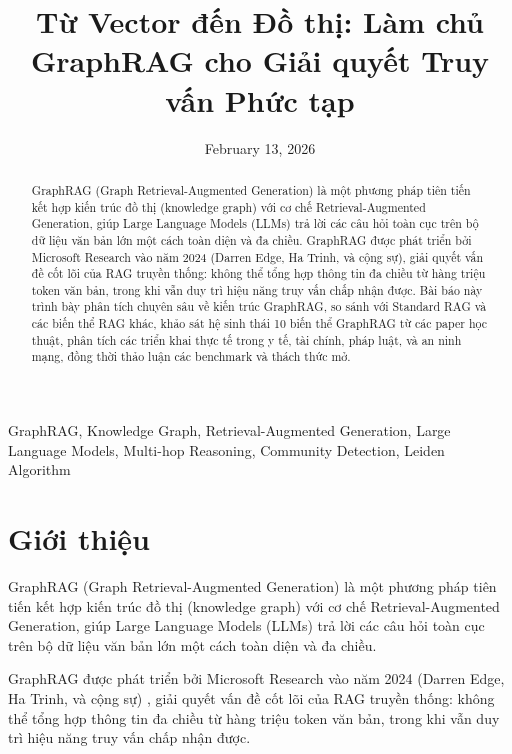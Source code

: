 \documentclass[conference]{IEEEtran}
\title{Từ Vector đến Đồ thị: Làm chủ GraphRAG cho Giải quyết Truy vấn Phức tạp}
\author{
    \IEEEauthorblockN{Sisyphus --- Dean of Computer Science (Simulation)}
    \IEEEauthorblockA{\textit{Academic Research Paper}}
}
\date{February 13, 2026}
\begin{document}
\maketitle

\begin{abstract}
GraphRAG (Graph Retrieval-Augmented Generation) là một phương pháp tiên tiến kết hợp kiến trúc đồ thị (knowledge graph) với cơ chế Retrieval-Augmented Generation, giúp Large Language Models (LLMs) trả lời các câu hỏi toàn cục trên bộ dữ liệu văn bản lớn một cách toàn diện và đa chiều. GraphRAG được phát triển bởi Microsoft Research vào năm 2024 (Darren Edge, Ha Trinh, và cộng sự), giải quyết vấn đề cốt lõi của RAG truyền thống: không thể tổng hợp thông tin đa chiều từ hàng triệu token văn bản, trong khi vẫn duy trì hiệu năng truy vấn chấp nhận được. Bài báo này trình bày phân tích chuyên sâu về kiến trúc GraphRAG, so sánh với Standard RAG và các biến thể RAG khác, khảo sát hệ sinh thái 10 biến thể GraphRAG từ các paper học thuật, phân tích các triển khai thực tế trong y tế, tài chính, pháp luật, và an ninh mạng, đồng thời thảo luận các benchmark và thách thức mở.
\end{abstract}

\begin{IEEEkeywords}
GraphRAG, Knowledge Graph, Retrieval-Augmented Generation, Large Language Models, Multi-hop Reasoning, Community Detection, Leiden Algorithm
\end{IEEEkeywords}

\section{Giới thiệu}

GraphRAG (Graph Retrieval-Augmented Generation) là một phương pháp tiên tiến kết hợp kiến trúc đồ thị (knowledge graph) với cơ chế Retrieval-Augmented Generation, giúp Large Language Models (LLMs) trả lời các câu hỏi toàn cục trên bộ dữ liệu văn bản lớn một cách toàn diện và đa chiều.

GraphRAG được phát triển bởi Microsoft Research vào năm 2024 (Darren Edge, Ha Trinh, và cộng sự) \cite{edge2024graphrag}, giải quyết vấn đề cốt lõi của RAG truyền thống: không thể tổng hợp thông tin đa chiều từ hàng triệu token văn bản, trong khi vẫn duy trì hiệu năng truy vấn chấp nhận được.
\end{document}

